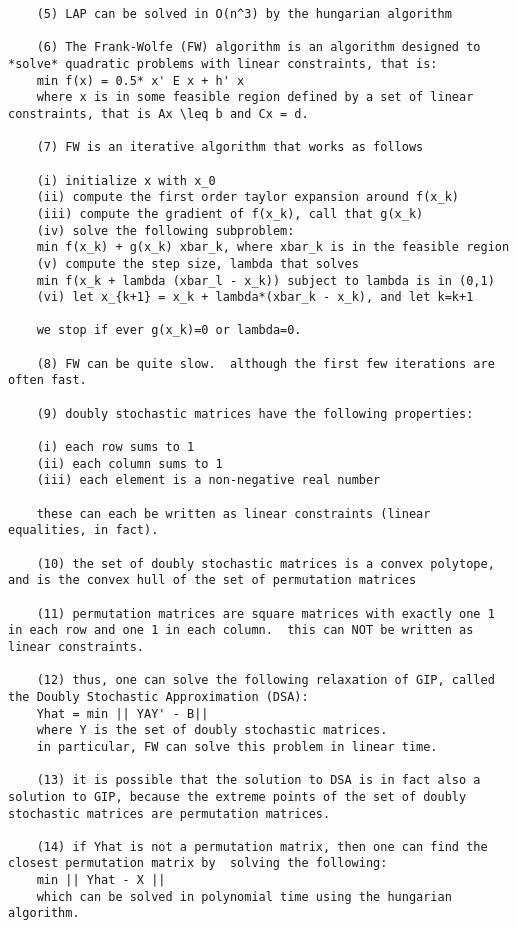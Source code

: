 \begin{verbatim}
	(5) LAP can be solved in O(n^3) by the hungarian algorithm

	(6) The Frank-Wolfe (FW) algorithm is an algorithm designed to *solve* quadratic problems with linear constraints, that is:
	min f(x) = 0.5* x' E x + h' x
	where x is in some feasible region defined by a set of linear constraints, that is Ax \leq b and Cx = d.

	(7) FW is an iterative algorithm that works as follows

	(i) initialize x with x_0
	(ii) compute the first order taylor expansion around f(x_k)
	(iii) compute the gradient of f(x_k), call that g(x_k)
	(iv) solve the following subproblem:
	min f(x_k) + g(x_k) xbar_k, where xbar_k is in the feasible region
	(v) compute the step size, lambda that solves
	min f(x_k + lambda (xbar_l - x_k)) subject to lambda is in (0,1)
	(vi) let x_{k+1} = x_k + lambda*(xbar_k - x_k), and let k=k+1

	we stop if ever g(x_k)=0 or lambda=0.

	(8) FW can be quite slow.  although the first few iterations are often fast.

	(9) doubly stochastic matrices have the following properties:

	(i) each row sums to 1
	(ii) each column sums to 1
	(iii) each element is a non-negative real number

	these can each be written as linear constraints (linear equalities, in fact).

	(10) the set of doubly stochastic matrices is a convex polytope, and is the convex hull of the set of permutation matrices

	(11) permutation matrices are square matrices with exactly one 1 in each row and one 1 in each column.  this can NOT be written as linear constraints.

	(12) thus, one can solve the following relaxation of GIP, called the Doubly Stochastic Approximation (DSA): 
	Yhat = min || YAY' - B||
	where Y is the set of doubly stochastic matrices.
	in particular, FW can solve this problem in linear time.

	(13) it is possible that the solution to DSA is in fact also a solution to GIP, because the extreme points of the set of doubly stochastic matrices are permutation matrices.

	(14) if Yhat is not a permutation matrix, then one can find the closest permutation matrix by  solving the following:
	min || Yhat - X ||
	which can be solved in polynomial time using the hungarian algorithm.  


\end{verbatim}
